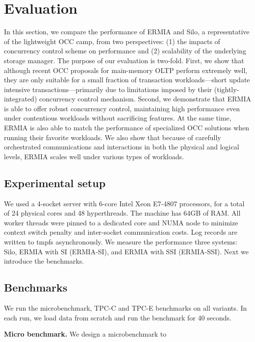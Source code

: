 
\section{Evaluation}
In this section, we compare the performance of ERMIA and Silo, a representative of the lightweight OCC camp, from two perspectives: (1) the impacts of concurrency control scheme on performance and (2) scalability of the underlying storage manager. The purpose of our evaluation is two-fold. First, we show that although recent OCC proposals for main-memory OLTP perform extremely well, they are only suitable for a small fraction of transaction workloads---short update intensive transactions---primarily due to limitations imposed by their (tightly-integrated) concurrency control mechanism. Second, we demonstrate that ERMIA is able to offer robust concurrency control, maintaining high performance even under contentious workloads without sacrificing features. At the same time, ERMIA is also able to match the performance of specialized OCC solutions when running their favorite workloads. We also show that because of carefully orchestrated communications and interactions in both the physical and logical levels, ERMIA scales well under various types of workloads.

\subsection{Experimental setup}
We used a 4-socket server with 6-core Intel Xeon E7-4807 processors, for a total of 24 physical cores and 48 hyperthreads. The machine has 64GB of RAM. All worker threads were pinned to a dedicated core and NUMA node to minimize context switch penalty and inter-socket communication costs. Log records are written to tmpfs asynchronously. We measure the performance three systems: Silo, ERMIA with SI (ERMIA-SI), and ERMIA with SSI (ERMIA-SSI). Next we introduce the benchmarks.

\subsection{Benchmarks}
We run the microbenchmark, TPC-C and TPC-E benchmarks on all variants. In each run, we load data from scratch and run the benchmark for 40 seconds.

\textbf{Micro benchmark.}
We design a microbenchmark to 

